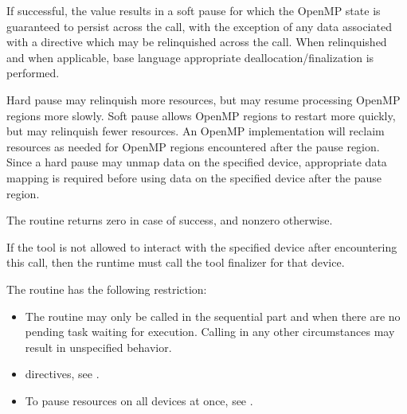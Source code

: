 If successful, the  value results in a soft pause for which the OpenMP state 
is guaranteed to persist across the call, with the exception of any data associated with a
  directive which may be relinquished across the call. 
When relinquished and when applicable, base language appropriate deallocation/finalization is performed. 

\begin{note}
Hard pause may relinquish more resources, but may resume processing OpenMP regions more slowly. 
Soft pause allows OpenMP regions to restart more quickly, but may relinquish fewer resources. 
An OpenMP implementation will reclaim resources as needed for OpenMP regions encountered after the pause region. 
Since  a hard pause may unmap data on the specified device, appropriate data mapping is required before 
using data on the specified device after the pause region.
 \end{note}
 
The routine returns zero in case of success, and nonzero otherwise.

\tools

If the tool is not allowed to interact with the specified device after encountering this call, then the runtime must call
the tool finalizer for that device.

\restrictions
The  routine has the following restriction:

\begin{itemize}
\item The routine may only be called in the sequential part and when there are no pending 
task waiting for execution. Calling in any other circumstances may result in unspecified behavior.
\end{itemize}

\crossreferences

\begin{itemize}
\item {} directives, see
.

\item To pause resources on all devices at once, see
.
\end{itemize}




\subsection{}
\label{subsec:omp_pause_resource_all}
\summary

